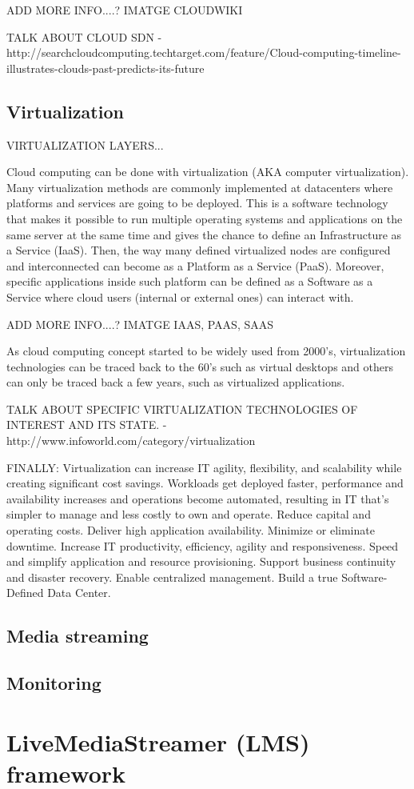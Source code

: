 ADD MORE INFO....? IMATGE CLOUDWIKI

TALK ABOUT CLOUD SDN - http://searchcloudcomputing.techtarget.com/feature/Cloud-computing-timeline-illustrates-clouds-past-predicts-its-future

\subsection{Virtualization}

VIRTUALIZATION LAYERS...

Cloud computing can be done with virtualization (AKA computer virtualization). Many virtualization methods are commonly implemented at datacenters where platforms and services are going to be deployed. This is a software technology that makes it possible to run multiple operating systems and applications on the same server at the same time and gives the chance to define an Infrastructure as a Service (IaaS). Then, the way many defined virtualized nodes are configured and interconnected can become as a Platform as a Service (PaaS). Moreover, specific applications inside such platform can be defined as a Software as a Service where cloud users (internal or external ones) can interact with.

ADD MORE INFO....? IMATGE IAAS, PAAS, SAAS

As cloud computing concept started to be widely used from 2000's, virtualization  technologies can be traced back to the 60’s such as virtual desktops and others can only be traced back a few years, such as virtualized applications.

TALK ABOUT SPECIFIC VIRTUALIZATION TECHNOLOGIES OF INTEREST AND ITS STATE. - http://www.infoworld.com/category/virtualization

FINALLY:
Virtualization can increase IT agility, flexibility, and scalability while creating significant cost savings. Workloads get deployed faster, performance and availability increases and operations become automated, resulting in IT that's simpler to manage and less costly to own and operate.
Reduce capital and operating costs.
Deliver high application availability.
Minimize or eliminate downtime.
Increase IT productivity, efficiency, agility and responsiveness.
Speed and simplify application and resource provisioning.
Support business continuity and disaster recovery.
Enable centralized management.
Build a true Software-Defined Data Center.

\subsection{Media streaming}


\subsection{Monitoring}


\section{LiveMediaStreamer (LMS) framework}







